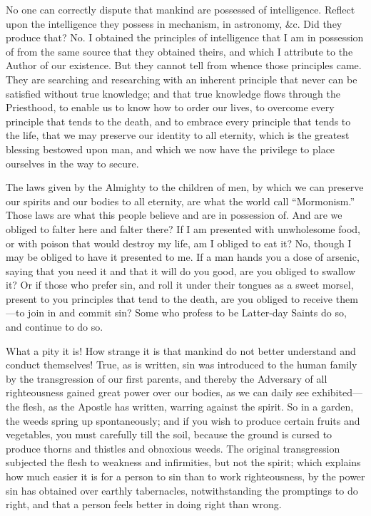 					No one can correctly dispute that mankind are possessed of intelligence. Reflect upon the intelligence they possess in mechanism, in astronomy, \&c. Did they produce that? No. I obtained the principles of intelligence that I am in possession of from the same source that they obtained theirs, and which I attribute to the Author of our existence. But they cannot tell from whence those principles came. They are searching and researching with an inherent principle that never can be satisfied without true knowledge; and that true knowledge flows through the Priesthood, to enable us to know how to order our lives, to overcome every principle that tends to the death, and to embrace every principle that tends to the life, that we may preserve our identity to all eternity, which is the greatest blessing bestowed upon man, and which we now have the privilege to place ourselves in the way to secure.

					The laws given by the Almighty to the children of men, by which we can preserve our spirits and our bodies to all eternity, are what the world call ``Mormonism.'' Those laws are what this people believe and are in possession of. And are we obliged to falter here and falter there? If I am presented with unwholesome food, or with poison that would destroy my life, am I obliged to eat it? No, though I may be obliged to have it presented to me. If a man hands you a dose of arsenic, saying that you need it and that it will do you good, are you obliged to swallow it? Or if those who prefer sin, and roll it under their tongues as a sweet morsel, present to you principles that tend to the death, are you obliged to receive them---to join in and commit sin? Some who profess to be Latter-day Saints do so, and continue to do so.

					What a pity it is! How strange it is that mankind do not better understand and conduct themselves! True, as is written, sin was introduced to the human family by the transgression of our first parents, and thereby the Adversary of all righteousness gained great power over our bodies, as we can daily see exhibited---the flesh, as the Apostle has written, warring against the spirit. So in a garden, the weeds spring up spontaneously; and if you wish to produce certain fruits and vegetables, you must carefully till the soil, because the ground is cursed to produce thorns and thistles and obnoxious weeds. The original transgression subjected the flesh to weakness and infirmities, but not the spirit; which explains how much easier it is for a person to sin than to work righteousness, by the power sin has obtained over earthly tabernacles, notwithstanding the promptings to do right, and that a person feels better in doing right than wrong.

